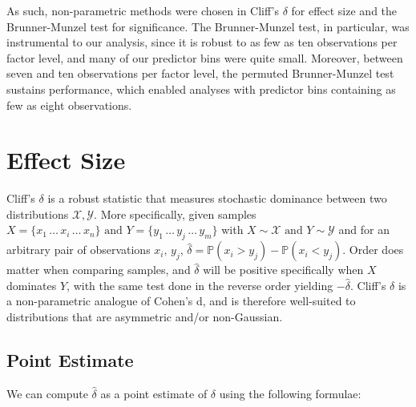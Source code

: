 \documentclass[pdflatex,sn-mathphys-num]{sn-jnl}
\theoremstyle{thmstyleone}
\theoremstyle{thmstyletwo}
\theoremstyle{thmstylethree}
\begin{document}
    \vspace{5pt}

    \par As such, non-parametric methods were chosen in Cliff's $\delta$ for effect size and the Brunner-Munzel test for significance. The Brunner-Munzel test, in particular, was instrumental to our analysis, since it is robust to as few as ten observations per factor level, and many of our predictor bins were quite small. Moreover, between seven and ten observations per factor level, the permuted Brunner-Munzel test sustains performance, which enabled analyses with predictor bins containing as few as eight observations.

    \vspace{10pt}

    \section{Effect Size}

    Cliff's $\delta$ is a robust statistic that measures stochastic dominance between two distributions $\mathcal{X}, \mathcal{Y}$. More specifically, given samples $X = \lbrace x_{1} \, \dots \, x_{i} \, \dots \, x_{n} \rbrace \text{ and } Y= \lbrace y_{1} \, \dots \, y_{j} \, \dots \, y_{m} \rbrace$ with $X \sim \mathcal{X} \text{ and } Y \sim \mathcal{Y}$ and for an arbitrary pair of observations $x_{i}, \, y_{j}$, $\hat{\delta} = \mathds{P}\left( x_{i} > y_{j} \right) - \mathds{P}\left( x_{i} < y_{j} \right)$. Order does matter when comparing samples, and $\hat{\delta}$ will be positive specifically when $X$ dominates $Y$, with the same test done in the reverse order yielding $-\hat{\delta}$. Cliff's $\delta$ is a non-parametric analogue of Cohen's d, and is therefore well-suited to distributions that are asymmetric and/or non-Gaussian. 

        \vspace{10pt}

        \subsection{Point Estimate}

            We can compute $\hat{\delta}$ as a point estimate of $\delta$ using the following formulae:

            \vspace{5pt}
\end{document}
